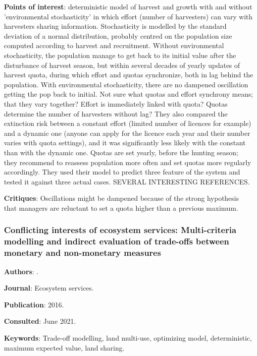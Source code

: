 \documentclass[12pt,a4paper]{article}
\begin{document}
\textbf{Points of interest}: deterministic model of harvest and growth with and without 'environmental stochasticity' in which effort (number of harvesters) can vary with harvesters sharing information. Stochasticity is modelled by the standard deviation of a normal distribution, probably centred on the population size computed according to harvest and recruitment. Without environmental stochasticity, the population manage to get back to its initial value after the disturbance of harvest season, but within several decades of yearly updates of harvest quota, during which effort and quotas synchronize, both in lag behind the population. With environmental stochasticity, there are no dampened oscillation getting the pop back to initial. Not sure what quotas and effort synchrony means; that they vary together? Effort is immediately linked with quota? Quotas determine the number of harvesters without lag? They also compared the extinction risk between a constant effort (limited number of licences for example) and a dynamic one (anyone can apply for the licence each year and their number varies with quota settings), and it was significantly less likely with the constant than with the dynamic one. Quotas are set yearly, before the hunting season; they recommend to reassess population more often and set quotas more regularly accordingly. They used their model to predict three feature of the system and tested it against three actual cases.
SEVERAL INTERESTING REFERENCES.

\textbf{Critiques}: Oscillations might be dampened because of the strong hypothesis that managers are reluctant to set a quota higher than a previous maximum.
 
\newpage

\subsubsection*{Conflicting interests of ecosystem services: Multi-criteria modelling and indirect evaluation of trade-offs between monetary and non-monetary measures}

\textbf{Authors}: \cite{wam2016conflicting}.

\textbf{Journal}: Ecosystem services.

\textbf{Publication}: 2016.

\textbf{Consulted}: June 2021.

\textbf{Keywords}: Trade-off modelling, land multi-use, optimizing model, deterministic, maximum expected value, land sharing.
\end{document}
